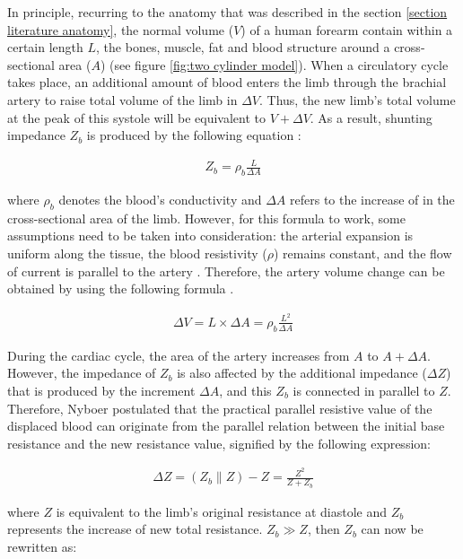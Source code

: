 In principle, recurring to the anatomy that was described in the section \ref{section literature anatomy}, the normal volume ($V$) of a human forearm contain within a certain length $L$, the bones, muscle, fat and blood structure around a cross-sectional area ($A$) (see figure \ref{fig:two cylinder model}). When a circulatory cycle takes place, an additional amount of blood enters the limb through the brachial artery to raise total volume of the limb in $\Delta V$. Thus, the new limb's total volume at the peak of this systole will be equivalent to $V + \Delta V$. As a result, shunting impedance $Z_b$ is produced by the following equation \cite{swanson1976origin, webster2009medical}:

\begin{align}
	\label{eq:blood impedance}
	Z_b = \rho_b \frac{L}{\Delta A}
\end{align}

where $\rho_b$ denotes the blood's conductivity and $\Delta A$ refers to the increase of in the cross-sectional area of the limb. However, for this formula to work, some assumptions need to be taken into consideration: the arterial expansion is uniform along the tissue, the blood resistivity ($\rho$) remains constant, and the flow of current is parallel to the artery \cite{bera2014bioelectrical}. Therefore, the artery volume change can be obtained by using the following formula \cite{swanson1976origin, webster2009medical}.

\begin{align}
	\label{eq:delta volume}
	\Delta V = L \times \Delta A = \rho_b \frac{L^2}{\Delta A}
\end{align}

During the cardiac cycle, the area of the artery increases from $A$ to $A + \Delta A$. However, the impedance of $Z_b$ is also affected by the additional impedance ($\Delta Z$) that is produced by the increment $\Delta A$, and this $Z_b$ is connected in parallel to $Z$. Therefore, Nyboer \cite{nyober1950electrical} postulated that the practical parallel resistive value of the displaced blood can originate from the parallel relation between the initial base resistance and the new resistance value, signified by the following expression:

\begin{align}
	\label{eq:parallel model}
	\Delta Z = (Z_b \parallel Z) - Z = \frac{Z^2}{Z + Z_b}
\end{align}

where $Z$ is equivalent to the limb's original resistance at diastole and $Z_b$ represents the increase of new total resistance. $Z_b \gg Z$, then $Z_b$ can now be rewritten as:

